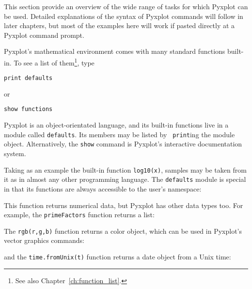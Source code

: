 This section provide an overview of the wide range of tasks for which Pyxplot
can be used. Detailed explanations of the syntax of Pyxplot commands will
follow in later chapters, but most of the examples here will work if pasted
directly at a Pyxplot command prompt.


Pyxplot's mathematical environment comes with many standard functions built-in.
To see a list of them\footnote{See also Chapter~\ref{ch:function_list}.}, type

\begin{verbatim}
print defaults
\end{verbatim}

\noindent or

\begin{verbatim}
show functions
\end{verbatim}

\noindent Pyxplot is an object-orientated language, and its built-in functions
live in a module called {\tt defaults}.  Its members may be listed by {\tt
print}ing the module object. Alternatively, the {\tt show} command is Pyxplot's
interactive documentation system.

Taking as an example the built-in function {\tt log10(x)}, samples may be taken
from it as in almost any other programming language. The {\tt defaults} module
is special in that its functions are always accessible to the user's namespace:

\vspace{3mm}

\vspace{3mm}

\noindent This function returns numerical data, but Pyxplot has other data
types too.  For example, the {\tt primeFactors} function returns a list:

\vspace{3mm}

\vspace{3mm}

\noindent The {\tt rgb(r,g,b)} function returns a color object, which can be
used in Pyxplot's vector graphics commands:

\vspace{3mm}

\vspace{3mm}

\noindent and the {\tt time.fromUnix(t)} function returns a date object from a
Unix time:

